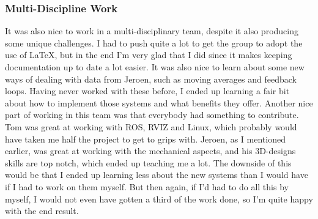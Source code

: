 \subsubsection{Multi-Discipline Work}
It was also nice to work in a multi-disciplinary team, despite it also producing some unique challenges.
I had to push quite a lot to get the group to adopt the use of \LaTeX, but in the end I'm very glad that I did since it makes keeping documentation up to date a lot easier.
It was also nice to learn about some new ways of dealing with data from Jeroen, such as moving averages and feedback loops.
Having never worked with these before, I ended up learning a fair bit about how to implement those systems and what benefits they offer.
Another nice part of working in this team was that everybody had something to contribute.
Tom was great at working with ROS, RVIZ and Linux, which probably would have taken me half the project to get to grips with.
Jeroen, as I mentioned earlier, was great at working with the mechanical aspects, and his 3D-designs skills are top notch, which ended up teaching me a lot.
The downside of this would be that I ended up learning less about the new systems than I would have if I had to work on them myself.
But then again, if I'd had to do all this by myself, I would not even have gotten a third of the work done, so I'm quite happy with the end result.



\newpage
